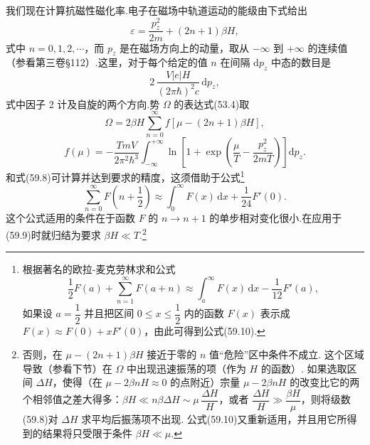 我们现在计算抗磁性磁化率.电子在磁场中轨道运动的能级由下式给出
\begin{equation}
  \varepsilon=\frac{p_z^2}{2m}+(2n+1)\beta H,
\end{equation}
式中 $n=0,1,2,\cdots$，而 $p_z$ 是在磁场方向上的动量，取从 $-\infty$ 到 $+\infty$ 的连续值（参看第三卷§112）.这里，对于每个给定的值 $n$ 在间隔 $\mathrm{d}p_z$ 中态的数目是
\begin{equation}
  2\,\frac{V|e|H}{(2\pi\hbar)^2c}\,\mathrm{d}p_z,
\end{equation}
式中因子 2 计及自旋的两个方向.势 $\Omega$ 的表达式(53.4)取
\begin{equation}
  \Omega=2\beta H\sum_{n=0}^{\infty}f\left[\mu-(2n+1)\beta H\right],
\end{equation}
\begin{equation}
  f(\mu)=-\frac{TmV}{2\pi^2\hbar^3}\int_{-\infty}^{+\infty}
  \ln\left[1+\exp\left(\frac{\mu}{T}-\frac{p_z^2}{2mT}\right)\right]\mathrm{d}p_z.
\end{equation}
和式(59.8)可计算并达到要求的精度，这须借助于公式\footnote{根据著名的欧拉-麦克劳林求和公式
\begin{equation*}
  \frac{1}{2}F(a)+\sum_{n=1}^\infty F(a+n)\approx\int_a^\infty F(x)\,\mathrm{d}x-\frac{1}{12}F'(a),
\tag{59.10a}
\end{equation*}
如果设 $a=\dfrac{1}{2}$ 并且把区间 $0\leqslant x\leqslant\dfrac{1}{2}$ 内的函数 $F(x)$ 表示成 $F(x)\approx F(0)+xF'(0)$，由此可得到公式(59.10).}
\begin{equation}
  \sum_{n=0}^{\infty}F\left(n+\frac{1}{2}\right)\approx\int_0^{\infty}F(x)\,\mathrm{d}x
  +\frac{1}{24}F'(0).
\end{equation}
这个公式适用的条件在于函数 $F$ 的 $n\to n+1$ 的单步相对变化很小.在应用于(59.9)时就归结为要求 $\beta H\ll T$.\footnote{否则，在 $\mu-(2n+1)\beta H$ 接近于零的 $n$ 值“危险”区中条件不成立. 这个区域导致（参看下节）在 $\Omega$ 中出现迅速振荡的项（作为 $H$ 的函数）. 如果选取区间 $\Delta H$，使得（在 $\mu-2\beta n H\approx0$ 的点附近）宗量 $\mu-2\beta n H$ 的改变比它的两个相邻值之差大得多：$\beta H\ll n\beta\Delta H\sim\mu\,\dfrac{\Delta H}{H}$，或者 $\dfrac{\Delta H}{H}\gg\dfrac{\beta H}{\mu}$，则将级数(59.8)对 $\Delta H$ 求平均后振荡项不出现. 公式(59.10)又重新适用，并且用它所得到的结果将只受限于条件 $\beta H\ll\mu$.}

